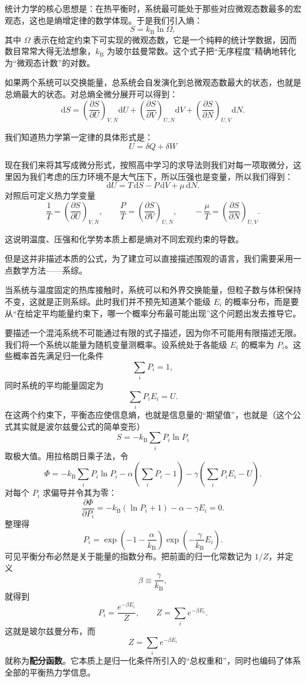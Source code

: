 \documentclass[UTF8]{ctexbook}
\begin{document}
统计力学的核心思想是：在热平衡时，系统最可能处于那些对应微观态数最多的宏观态，这也是熵增定律的数学体现。于是我们引入熵：
\[
S=k_{\mathrm B}\ln \Omega,
\]
其中 \(\Omega\) 表示在给定约束下可实现的微观态数，它是一个纯粹的统计学数据，因而数目常常大得无法想象，\(k_{\mathrm B}\) 为玻尔兹曼常数。这个式子把“无序程度”精确地转化为“微观态计数”的对数。

如果两个系统可以交换能量，总系统会自发演化到总微观态数最大的状态，也就是总熵最大的状态。对总熵全微分展开可以得到：
\[
\mathrm dS=\left(\frac{\partial S}{\partial U}\right)_{V,N}\mathrm dU+\left(\frac{\partial S}{\partial V}\right)_{U,N}\mathrm dV+\left(\frac{\partial S}{\partial N}\right)_{U,V}\mathrm dN.
\]

我们知道热力学第一定律的具体形式是：
\[
 U= \delta Q + \delta W
\]

现在我们来将其写成微分形式，按照高中学习的求导法则我们对每一项取微分，这里因为我们考虑的压力环境不是大气压下，所以压强也是变量，所以我们得到：
\[
\mathrm dU=T\,\mathrm dS-P\,\mathrm dV+\mu\,\mathrm dN.
\]
对照后可定义热力学变量
\[
\frac{1}{T}=\left(\frac{\partial S}{\partial U}\right)_{V,N},
\qquad
\frac{P}{T}=\left(\frac{\partial S}{\partial V}\right)_{U,N},
\qquad
-\frac{\mu}{T}=\left(\frac{\partial S}{\partial N}\right)_{U,V}.
\]

这说明温度、压强和化学势本质上都是熵对不同宏观约束的导数。

但是这并非描述本质的公式，为了建立可以直接描述围观的语言，我们需要采用一点数学方法——系综。

当系统与温度固定的热库接触时，系统可以和外界交换能量，但粒子数与体积保持不变，这就是正则系综。此时我们并不预先知道某个能级 \(E_i\) 的概率分布，而是要从“在给定平均能量约束下，哪一个概率分布最可能出现”这个问题出发去推导它。

要描述一个混沌系统不可能通过有限的式子描述，因为你不可能用有限描述无限。我们将一个系统以能量为随机变量测概率。设系统处于各能级 \(E_i\) 的概率为 \(P_i\)。这些概率首先满足归一化条件
\[
\sum_i P_i=1,
\]
同时系统的平均能量固定为
\[
\sum_i P_i E_i=U.
\]
在这两个约束下，平衡态应使信息熵，也就是信息量的“期望值”，也就是（这个公式其实就是波尔兹曼公式的简单变形）
\[
S=-k_{\mathrm B}\sum_i P_i\ln P_i
\]
取极大值。用拉格朗日乘子法，令
\[
\Phi=-k_{\mathrm B}\sum_i P_i\ln P_i-\alpha\left(\sum_i P_i-1\right)-\gamma\left(\sum_i P_iE_i-U\right).
\]
对每个 \(P_i\) 求偏导并令其为零：
\[
\frac{\partial \Phi}{\partial P_i}=-k_{\mathrm B}(\ln P_i+1)-\alpha-\gamma E_i=0.
\]
整理得
\[
P_i=\exp\left(-1-\frac{\alpha}{k_{\mathrm B}}\right)\exp\left(-\frac{\gamma}{k_{\mathrm B}}E_i\right).
\]
可见平衡分布必然是关于能量的指数分布。把前面的归一化常数记为 \(1/Z\)，并定义
\[
\beta\equiv \frac{\gamma}{k_{\mathrm B}},
\]
就得到
\[
P_i=\frac{e^{-\beta E_i}}{Z},
\qquad
Z=\sum_i e^{-\beta E_i}.
\]
这就是玻尔兹曼分布，而
\[
Z=\sum_i e^{-\beta E_i}
\]
就称为\textbf{配分函数}。它本质上是归一化条件所引入的“总权重和”，同时也编码了体系全部的平衡热力学信息。
\end{document}
